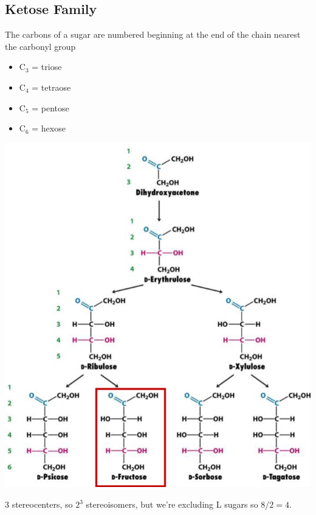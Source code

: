 \documentclass[10pt]{article}
\begin{document}
\subsection*{Ketose Family}
The carbons of a sugar are numbered beginning at the end of the chain nearest the carbonyl group
\begin{itemize}
    \item C$_3$ = triose
    \item C$_4$ = tetraose
    \item C$_5$ = pentose
    \item C$_6$ = hexose
\end{itemize}
\begin{center}
    \includegraphics*[scale=0.6]{L1_5.png}
\end{center}
3 stereocenters, so $2^3$ stereoisomers, but we're excluding L sugars so $8/2=4$.
\end{document}
